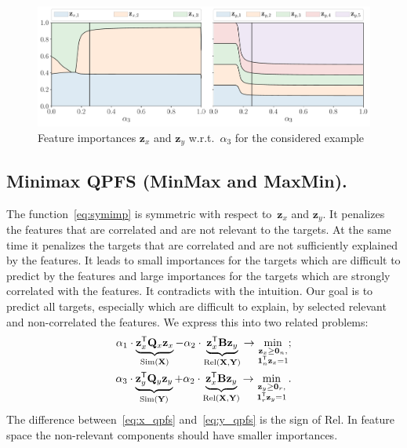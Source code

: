 \documentclass[12pt,twoside]{article}
\theoremstyle{definition}
\newcommand{\bz}{\mathbf{z}}
\newcommand{\bY}{\mathbf{Y}}
\newcommand{\bX}{\mathbf{X}}
\newcommand{\bQ}{\mathbf{Q}}
\newcommand{\T}{\mathsf{T}}
\newcommand{\bOne}{\boldsymbol{1}}
\newcommand{\bZero}{\boldsymbol{0}}
\begin{document}
\begin{figure}
	\centering
	\includegraphics[width=\linewidth]{figs/features_vs_alpha.pdf}
	\caption{Feature importances $\bz_x$ and $\bz_y$ w.r.t.~$\alpha_3$ for the considered example}
	\label{fig:features_vs_alpha}
\end{figure}

\subsection{Minimax QPFS (MinMax and MaxMin).}
The function~\eqref{eq:symimp} is symmetric with respect to~$\bz_x$ and $\bz_y$.
It penalizes the features that are correlated and are not relevant to the targets.
At the same time it penalizes the targets that are correlated and are not sufficiently explained by the features.
It leads to small importances for the targets which are difficult to predict by the features and large importances for the targets which are strongly correlated with the features.
It contradicts with the intuition.
Our goal is to predict all targets, especially which are difficult to explain, by selected relevant and non-correlated the features. We express this into two related problems:
\begin{align}
\alpha_1 \cdot \underbrace{\bz_x^{\T} \bQ_x \bz_x}_{\text{Sim}(\bX)} - \alpha_2 \cdot \underbrace{\vphantom{()} \bz_x^{\T}\mathbf{B} \bz_y}_{\text{Rel}(\bX, \bY)} \rightarrow \min_{\substack{\bz_x \geq \bZero_n, \\ \bOne_n^{\T}\bz_x=1}};
\label{eq:x_qpfs}\\
\alpha_3 \cdot \underbrace{\bz_y^{\T} \bQ_y \bz_y}_{\text{Sim}(\bY)} + \alpha_2 \cdot \underbrace{\vphantom{()} \bz_x^{\T} \mathbf{B} \bz_y}_{\text{Rel}(\bX, \bY)} \rightarrow \min_{\substack{\bz_y \geq \bZero_r,  \\ \bOne_r^{\T}\bz_y=1}}.
\label{eq:y_qpfs}
\end{align}
The difference between~\eqref{eq:x_qpfs} and~\eqref{eq:y_qpfs} is the sign of Rel.
In feature space the non-relevant components should have smaller importances.
\end{document}
